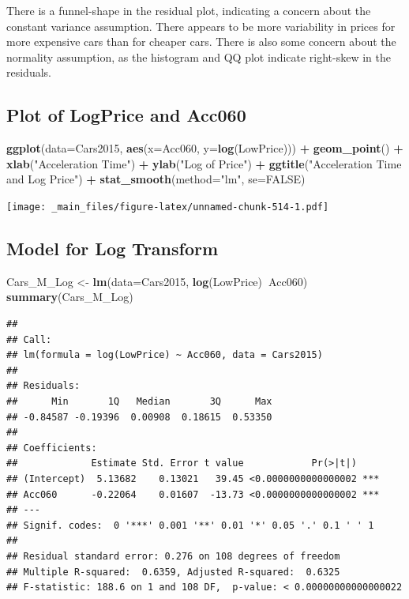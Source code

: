 \documentclass[]{book}
\newenvironment{Shaded}{\begin{snugshade}}{\end{snugshade}}
\newcommand{\KeywordTok}[1]{\textcolor[rgb]{0.13,0.29,0.53}{\textbf{#1}}}
\newcommand{\DataTypeTok}[1]{\textcolor[rgb]{0.13,0.29,0.53}{#1}}
\newcommand{\StringTok}[1]{\textcolor[rgb]{0.31,0.60,0.02}{#1}}
\newcommand{\OtherTok}[1]{\textcolor[rgb]{0.56,0.35,0.01}{#1}}
\newcommand{\OperatorTok}[1]{\textcolor[rgb]{0.81,0.36,0.00}{\textbf{#1}}}
\newcommand{\NormalTok}[1]{#1}
\begin{document}
There is a funnel-shape in the residual plot, indicating a concern about
the constant variance assumption. There appears to be more variability
in prices for more expensive cars than for cheaper cars. There is also
some concern about the normality assumption, as the histogram and QQ
plot indicate right-skew in the residuals.

\subsection{Plot of LogPrice and
Acc060}\label{plot-of-logprice-and-acc060}

\begin{Shaded}
\begin{Highlighting}[]
\KeywordTok{ggplot}\NormalTok{(}\DataTypeTok{data=}\NormalTok{Cars2015, }\KeywordTok{aes}\NormalTok{(}\DataTypeTok{x=}\NormalTok{Acc060, }\DataTypeTok{y=}\KeywordTok{log}\NormalTok{(LowPrice))) }\OperatorTok{+}\StringTok{ }\KeywordTok{geom_point}\NormalTok{() }\OperatorTok{+}\StringTok{ }
\StringTok{  }\KeywordTok{xlab}\NormalTok{(}\StringTok{"Acceleration Time"}\NormalTok{) }\OperatorTok{+}\StringTok{ }\KeywordTok{ylab}\NormalTok{(}\StringTok{"Log of Price"}\NormalTok{) }\OperatorTok{+}\StringTok{ }
\StringTok{  }\KeywordTok{ggtitle}\NormalTok{(}\StringTok{"Acceleration Time and Log Price"}\NormalTok{) }\OperatorTok{+}\StringTok{ }\KeywordTok{stat_smooth}\NormalTok{(}\DataTypeTok{method=}\StringTok{"lm"}\NormalTok{, }\DataTypeTok{se=}\OtherTok{FALSE}\NormalTok{)}
\end{Highlighting}
\end{Shaded}

\texttt{[image: \_main\_files/figure-latex/unnamed-chunk-514-1.pdf]}

\subsection{Model for Log Transform}\label{model-for-log-transform}

\begin{Shaded}
\begin{Highlighting}[]
\NormalTok{Cars_M_Log <-}\StringTok{ }\KeywordTok{lm}\NormalTok{(}\DataTypeTok{data=}\NormalTok{Cars2015, }\KeywordTok{log}\NormalTok{(LowPrice)}\OperatorTok{~}\NormalTok{Acc060)}
\KeywordTok{summary}\NormalTok{(Cars_M_Log)}
\end{Highlighting}
\end{Shaded}

\begin{verbatim}
## 
## Call:
## lm(formula = log(LowPrice) ~ Acc060, data = Cars2015)
## 
## Residuals:
##      Min       1Q   Median       3Q      Max 
## -0.84587 -0.19396  0.00908  0.18615  0.53350 
## 
## Coefficients:
##             Estimate Std. Error t value            Pr(>|t|)    
## (Intercept)  5.13682    0.13021   39.45 <0.0000000000000002 ***
## Acc060      -0.22064    0.01607  -13.73 <0.0000000000000002 ***
## ---
## Signif. codes:  0 '***' 0.001 '**' 0.01 '*' 0.05 '.' 0.1 ' ' 1
## 
## Residual standard error: 0.276 on 108 degrees of freedom
## Multiple R-squared:  0.6359, Adjusted R-squared:  0.6325 
## F-statistic: 188.6 on 1 and 108 DF,  p-value: < 0.00000000000000022
\end{verbatim}
\end{document}
